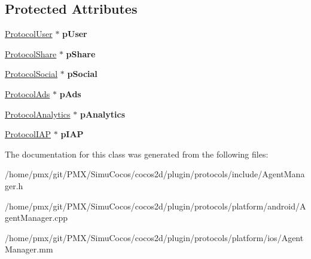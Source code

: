 \subsection*{Protected Attributes}
\begin{DoxyCompactItemize}
\item 
\mbox{\label{classcocos2d_1_1plugin_1_1AgentManager_a27a139a1c75bae6049fb80fcb5e399db}} 
\hyperlink{classcocos2d_1_1plugin_1_1ProtocolUser}{Protocol\+User} $\ast$ {\bfseries p\+User}
\item 
\mbox{\label{classcocos2d_1_1plugin_1_1AgentManager_a964aef41f31ae3cf1010f6fee87f2310}} 
\hyperlink{classcocos2d_1_1plugin_1_1ProtocolShare}{Protocol\+Share} $\ast$ {\bfseries p\+Share}
\item 
\mbox{\label{classcocos2d_1_1plugin_1_1AgentManager_a19d2c0916871fc4ca4a0a17720f7558e}} 
\hyperlink{classcocos2d_1_1plugin_1_1ProtocolSocial}{Protocol\+Social} $\ast$ {\bfseries p\+Social}
\item 
\mbox{\label{classcocos2d_1_1plugin_1_1AgentManager_a6f35e3d89b39a2b6431e2046b49ac51a}} 
\hyperlink{classcocos2d_1_1plugin_1_1ProtocolAds}{Protocol\+Ads} $\ast$ {\bfseries p\+Ads}
\item 
\mbox{\label{classcocos2d_1_1plugin_1_1AgentManager_ae8d7c40937cd168e321ab939a9340de6}} 
\hyperlink{classcocos2d_1_1plugin_1_1ProtocolAnalytics}{Protocol\+Analytics} $\ast$ {\bfseries p\+Analytics}
\item 
\mbox{\label{classcocos2d_1_1plugin_1_1AgentManager_a59ea540245173cee600bdd9eac02947d}} 
\hyperlink{classcocos2d_1_1plugin_1_1ProtocolIAP}{Protocol\+I\+AP} $\ast$ {\bfseries p\+I\+AP}
\end{DoxyCompactItemize}


The documentation for this class was generated from the following files\+:\begin{DoxyCompactItemize}
\item 
/home/pmx/git/\+P\+M\+X/\+Simu\+Cocos/cocos2d/plugin/protocols/include/Agent\+Manager.\+h\item 
/home/pmx/git/\+P\+M\+X/\+Simu\+Cocos/cocos2d/plugin/protocols/platform/android/Agent\+Manager.\+cpp\item 
/home/pmx/git/\+P\+M\+X/\+Simu\+Cocos/cocos2d/plugin/protocols/platform/ios/Agent\+Manager.\+mm\end{DoxyCompactItemize}

